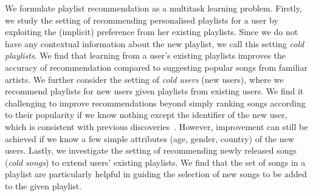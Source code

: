 
We formulate playlist recommendation as a multitask learning problem.
Firstly, we study the setting of recommending %
personalised playlists for a user
by exploiting the (implicit) preference %
from her existing playlists.
Since we do not have any contextual information about the new playlist, 
we call this setting \emph{cold playlists}.
We find that learning from a user's existing playlists %
improves the accuracy of recommendation compared to 
suggesting popular songs from familiar artists.
%
We further consider the setting of \emph{cold users} (\ie new users),
where we recommend playlists for new users %
given playlists from existing users.
We find it challenging to improve recommendations beyond simply ranking songs according to their popularity 
if we know nothing except the identifier of the new user, %
which is consistent with previous 
discoveries~\cite{mcfee2012million,bonnin2013evaluating,bonnin2015automated}.
However, improvement can still be achieved if we know a few simple attributes (\eg age, gender, country) %
of the new users.
%
%
%
Lastly, we investigate the setting of recommending newly released songs (\ie \emph{cold songs}) 
to extend users' existing playlists. 
We find that the set of songs in a playlist are particularly %
helpful in guiding %
the selection of new songs to be added to the given playlist.

